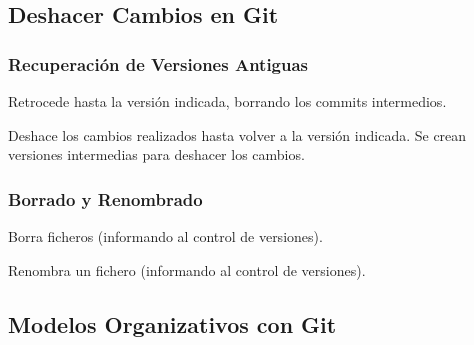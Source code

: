 \documentclass[hanbdout,a4paper,slidestop,dvips,xcolor=pst,blue]{beamer}
\begin{document}
\begin{frame}[t]
\end{frame}

\subsection{Deshacer Cambios en Git}

\begin{frame}[c]
	\frametitle{Recuperación de Versiones Antiguas}
	 \begin{description}[<+->]
        \item[reset] Retrocede hasta la versión indicada, borrando los commits intermedios.
        \item[revert] Deshace los cambios realizados hasta volver a la versión indicada. Se crean versiones intermedias para deshacer los cambios.
	 \end{description}
\end{frame}

\begin{frame}[c]
	\frametitle{Borrado y Renombrado}
	 \begin{description}[<+->]
        \item[rm] Borra ficheros (informando al control de versiones).
        \item[mv] Renombra un fichero (informando al control de versiones).
	 \end{description}
\end{frame}

\subsection{Modelos Organizativos con Git}
\end{document}
